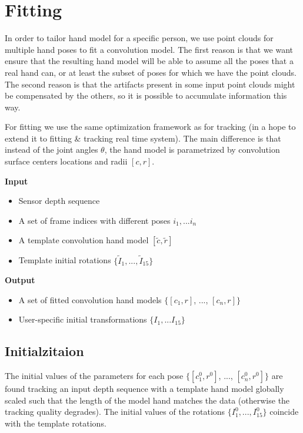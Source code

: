 \section{Fitting}

In order to tailor hand model for a specific person, we use point clouds for multiple hand poses to fit a convolution model. The first reason is that we want ensure that the resulting hand model will be able to assume all the poses that a real hand can, or at least the subset of poses for which we have the point clouds. The second reason is that the artifacts present in some input point clouds might be compensated by the others, so it is possible to accumulate information this way.
 
For fitting we use the same optimization framework as for tracking (in a hope to extend it to fitting \& tracking real time system). The main difference is that instead of the joint angles $\theta$, the hand model is parametrized by convolution surface centers locations and radii $[c , r]$. 

\textbf{Input}
\begin{itemize}
\item Sensor depth sequence 
\item A set of frame indices with different poses $i_1, ... i_n$
\item A template convolution hand model $[\tilde{c} ,\tilde{r}]$ 
\item Template initial rotations $\{\tilde{I}_1, ..., \tilde{I}_{15}\}$
\end{itemize}

\textbf{Output}
\begin{itemize}
\item A set of fitted convolution hand models $\{[c_1 , r]$, ..., $[c_n , r]\}$
\item  User-specific initial transformations $\{I_1, ... I_{15}\}$
\end{itemize}

\subsection{Initialzitaion}
The initial values of the parameters for each pose  $\{[c^0_1 , r^0]$, ..., $[c^0_n, r^0]\}$ are found tracking an input depth sequence with a template hand model globally scaled such that the length of the model hand matches the data (otherwise the tracking quality degrades). The initial values of the rotations  $\{I^0_1, ..., I^0_{15}\}$ coincide with the template rotations.

